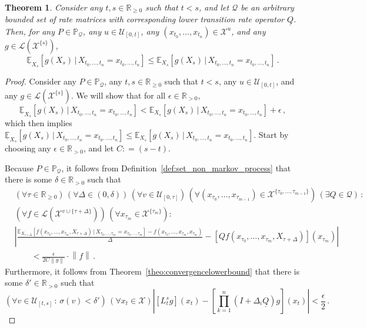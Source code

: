 \documentclass[10pt]{paper}
\newtheorem{theorem}{Theorem}
\newcommand{\reals}{\mathbb{R}}
\newcommand{\realspos}{\reals_{>0}}
\newcommand{\realsnonneg}{\reals_{\geq 0}}
\newcommand{\states}{\mathcal{X}}
\newcommand{\processes}{\mathbb{P}}
\newcommand{\gambles}{\mathcal{L}}
\newcommand{\rateset}{\mathcal{Q}}
\newcommand{\lrate}{\underline{Q}}
\newcommand{\norm}[1]{\left\lVert #1 \right\rVert}
\newcommand{\abs}[1]{\left\vert #1 \right\vert}
\newcommand{\coloneqq}{:\!=}
\begin{document}
\begin{theorem}\label{theorem:nonmarkov_single_var_lower_bounded}
Consider any $t,s\in\realsnonneg$ such that $t<s$, and let $\rateset$ be an arbitrary bounded set of rate matrices with corresponding lower transition rate operator $\lrate$. Then, for any $P\in\processes_\rateset$, any $u\in\mathcal{U}_{[0,t]}$, any $(x_{t_0},\ldots,x_{t_n})\in\states^u$, and any $g\in\gambles(\states^{\{s\}})$,
\begin{equation*}
\underline{\mathbb{E}}_{X_s}[g(X_s)\,\vert\,X_{t_0,\ldots,t_n}=x_{t_0,\ldots,t_n}] \leq \mathbb{E}_{X_s}[g(X_s)\,\vert\,X_{t_0,\ldots,t_n}=x_{t_0,\ldots,t_n}]\,.
\end{equation*}
\end{theorem}
\begin{proof}
Consider any $P\in\processes_\rateset$, any $t,s\in\realsnonneg$ such that $t<s$, any $u\in\mathcal{U}_{[0,t]}$, and any $g\in\gambles(\states^{\{s\}})$. We will show that for all $\epsilon\in\realspos$,
\begin{equation*}
\underline{\mathbb{E}}_{X_s}[g(X_s)\,\vert\,X_{t_0,\ldots,t_n}=x_{t_0,\ldots,t_n}] < \mathbb{E}_{X_s}[g(X_s)\,\vert\,X_{t_0,\ldots,t_n}=x_{t_0,\ldots,t_n}] + \epsilon\,,
\end{equation*}
which then implies $\underline{\mathbb{E}}_{X_s}[g(X_s)\,\vert\,X_{t_0,\ldots,t_n}=x_{t_0,\ldots,t_n}] \leq \mathbb{E}_{X_s}[g(X_s)\,\vert\,X_{t_0,\ldots,t_n}=x_{t_0,\ldots,t_n}]$. Start by choosing any $\epsilon\in\realspos$, and let $C\coloneqq (s-t)$.

Because $P\in\processes_\rateset$, it follows from Definition~\ref{def:set_non_markov_process} that there is some $\delta\in\realspos$ such that
\begin{align*}
 &(\forall \tau\in\realsnonneg)\,(\forall\Delta\in(0,\delta))\,(\forall v\in\mathcal{U}_{[0,\tau]})\,(\forall(x_{\tau_0},\ldots,x_{\tau_{m-1}})\in\states^{\{\tau_0,\ldots,\tau_{m-1}\}})\,(\exists Q\in\rateset)\,: \\
 &(\forall f\in\gambles(\states^{v\cup\{\tau+\Delta\}}))\,(\forall x_{\tau_m}\in\states^{\{\tau_m\}}): \\
 &\abs{\frac{\mathbb{E}_{X_{\tau+\Delta}}[f(x_{\tau_0},\ldots,x_{\tau_m},X_{\tau+\Delta})\,\vert\,X_{\tau_0,\ldots,\tau_m}=x_{\tau_0,\ldots,\tau_m}] - f(x_{\tau_0},\ldots,x_{\tau_m},x_{\tau_m})}{\Delta} - \left[Q f(x_{\tau_0},\ldots,x_{\tau_{m}},X_{\tau+\Delta})\right](x_{\tau_m})} \\ 
 &\quad\quad < \frac{\epsilon}{2C\norm{g}}\cdot\norm{f}\,.
\end{align*}
Furthermore, it follows from Theorem~\ref{theo:convergencelowerbound} that there is some $\delta'\in\realspos$ such that
\begin{equation}
(\forall v\in\mathcal{U}_{[t,s]}\,:\,\sigma(v)<\delta')\,(\forall x_t\in\states)\abs{\left[L_t^s g\right](x_t) - \left[\prod_{k=1}^n(I+\Delta_i\lrate)g\right](x_t)} < \frac{\epsilon}{2}\,.
\end{equation}


\end{proof}
\end{document}
